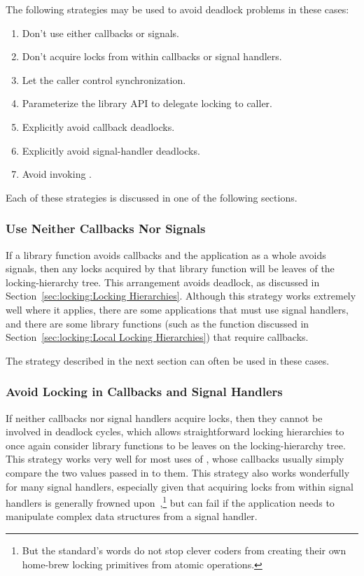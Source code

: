 The following strategies may be used to avoid deadlock problems in these cases:

\begin{enumerate}
\item	Don't use either callbacks or signals.
\item	Don't acquire locks from within callbacks or signal handlers.
\item	Let the caller control synchronization.
\item	Parameterize the library API to delegate locking to caller.
\item	Explicitly avoid callback deadlocks.
\item	Explicitly avoid signal-handler deadlocks.
\item	Avoid invoking .
\end{enumerate}

Each of these strategies is discussed in one of the following sections.

\subsubsection{Use Neither Callbacks Nor Signals}
\label{sec:locking:Use Neither Callbacks Nor Signals}

If a library function avoids callbacks and the application as a whole
avoids signals, then any locks acquired by that library function will
be leaves of the locking-hierarchy tree.
This arrangement avoids deadlock, as discussed in
Section~\ref{sec:locking:Locking Hierarchies}.
Although this strategy works extremely well where it applies,
there are some applications that must use signal handlers,
and there are some library functions (such as the  function
discussed in
Section~\ref{sec:locking:Local Locking Hierarchies})
that require callbacks.

The strategy described in the next section can often be used in these cases.

\subsubsection{Avoid Locking in Callbacks and Signal Handlers}
\label{sec:locking:Avoid Locking in Callbacks and Signal Handlers}

If neither callbacks nor signal handlers acquire locks, then they
cannot be involved in deadlock cycles, which allows straightforward
locking hierarchies to once again consider library functions to
be leaves on the locking-hierarchy tree.
This strategy works very well for most uses of , whose
callbacks usually simply compare the two values passed in to them.
This strategy also works wonderfully for many signal handlers,
especially given that acquiring locks from within signal handlers
is generally frowned upon~\cite{TheOpenGroup1997SUS},\footnote{
	But the standard's words do not stop clever coders from creating
	their own home-brew locking primitives from atomic operations.}
but can fail if the application needs to manipulate complex data structures
from a signal handler.

